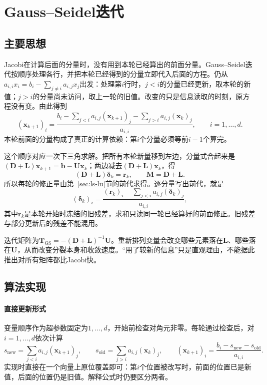 \section{Gauss--Seidel迭代}
\label{sec:ls-gauss-seidel}

\subsection{主要思想}

Jacobi在计算后面的分量时，没有用到本轮已经算出的前面分量。Gauss--Seidel迭代按顺序处理各行，并把本轮已经得到的分量立即代入后面的方程。仍从$a_{i,i}x_i=b_i-\sum_{j\neq i}a_{i,j}x_j$出发：处理第$i$行时，$j<i$的分量已经更新，取本轮的新值；$j>i$的分量尚未访问，取上一轮的旧值。改变的只是信息读取的时刻，原方程没有变。由此得到
\[
(\bm x_{k+1})_i=\frac{b_i-\sum_{j<i}a_{i,j}(\bm x_{k+1})_j-\sum_{j>i}a_{i,j}(\bm x_k)_j}{a_{i,i}},\qquad i=1,\ldots,d .
\]
本轮前面的分量构成了真正的计算依赖：第$i$个分量必须等前$i-1$个算完。

这个顺序对应一次下三角求解。把所有本轮新量移到左边，分量式合起来是$(\bm D+\bm L)\bm x_{k+1}=\bm b-\bm U\bm x_k$；两边减去$(\bm D+\bm L)\bm x_k$，得
\[
(\bm D+\bm L)\bm\delta_k=\bm r_k ,\qquad \bm M=\bm D+\bm L .
\]
所以每轮的修正量由第~\ref{sec:ls-lu}节的前代求得。逐分量写出前代，就是
\[
(\bm\delta_k)_i=\frac{(\bm r_k)_i-\sum_{j<i}a_{i,j}(\bm\delta_k)_j}{a_{i,i}},
\]
其中$\bm r_k$是本轮开始时冻结的旧残差，求和只读同一轮已经算好的前面修正。旧残差与部分更新后的残差不能混用。

迭代矩阵为$\bm T_{\mathrm{GS}}=-(\bm D+\bm L)^{-1}\bm U$。重新排列变量会改变哪些元素落在$\bm L$、哪些落在$\bm U$，从而改变分裂本身和收敛速度。“用了较新的信息”只是直观理由，不能据此推出对所有矩阵都比Jacobi快。

\subsection{算法实现}

\paragraph{直接更新形式}
变量顺序作为超参数固定为$1,\ldots,d$，开始前检查对角元非零。每轮通过检查后，对$i=1,\ldots,d$依次计算
\[
s_{\mathrm{new}}=\sum_{j<i}a_{i,j}(\bm x_{k+1})_j,\qquad
s_{\mathrm{old}}=\sum_{j>i}a_{i,j}(\bm x_k)_j,\qquad
(\bm x_{k+1})_i=\frac{b_i-s_{\mathrm{new}}-s_{\mathrm{old}}}{a_{i,i}} .
\]
实现时直接在一个向量上原位覆盖即可：第$i$个位置被改写时，前面的位置已是新值，后面的位置仍是旧值。解释公式时仍要区分两者。

